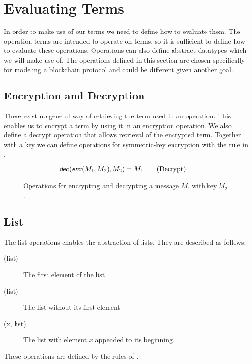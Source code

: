 \section{Evaluating Terms}
In order to make use of our terms we need to define how to evaluate them.
The operation terms are intended to operate on terms, so it is sufficient to define how to evaluate these operations.
Operations can also define abstract datatypes which we will make use of.
The operations defined in this section are chosen specifically for modeling a blockchain protocol and could be different given another goal.



\subsection{Encryption and Decryption}
There exist no general way of retrieving the term used in an operation.
This enables us to encrypt a term by using it in an encryption operation.
We also define a decrypt operation that allows retrieval of the encrypted term.
Together with a key we can define operations for symmetric-key encryption with the rule in .

\begin{figure}[h]
    \begin{align*}
        &\text{\sffamily \textit{dec}\normalfont}(\text{\sffamily \textit{enc}\normalfont}(M_1, M_2),M_2) = M_1 \tag{Decrypt}
    \end{align*}
    \caption{Operations for encrypting and decrypting a message $M_1\ \mathrm{with\ key}\ M_2$.}
    \label{decryptrule}
\end{figure}
\FloatBarrier

\subsection{List}
The list operations enables the abstraction of lists.
They are described as follows:

\begin{description}
	\item[(list)] The first element of the list
	\item[(list)] The list without its first element
	\item[(x, list)] The list with element $x$ appended to its beginning.
\end{description}

These operations are defined by the rules of .


